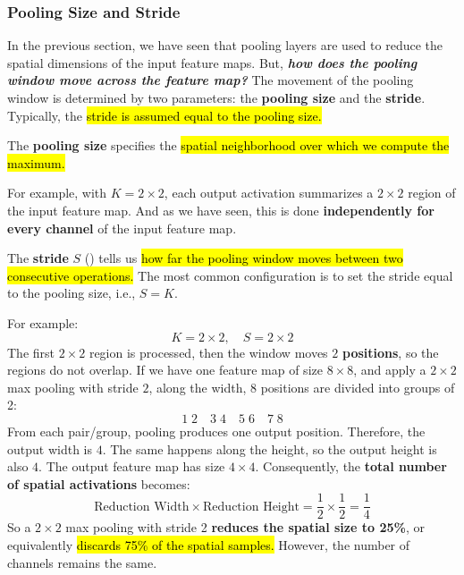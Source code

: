 \subsubsection{Pooling Size and Stride}\label{sec:pooling-size-and-stride}

In the previous section, we have seen that pooling layers are used to reduce the spatial dimensions of the input feature maps. But, \emph{\textbf{how does the pooling window move across the feature map?}} The movement of the pooling window is determined by two parameters: the \textbf{pooling size} and the \textbf{stride}. Typically, the \hl{stride is assumed equal to the pooling size.}

\highspace
\begin{flushleft}
    \textcolor{Green3}{ }
\end{flushleft}
The \textbf{pooling size} specifies the \hl{spatial neighborhood over which we compute the maximum.}

\highspace
For example, with $K = 2 \times 2$, each output activation summarizes a $2 \times 2$ region of the input feature map. And as we have seen, this is done \textbf{independently for every channel} of the input feature map.

\highspace
\begin{flushleft}
    \textcolor{Green3}{ }
\end{flushleft}
The \textbf{stride} $S$ () tells us \hl{how far the pooling window moves between two consecutive operations.} The most common configuration is to set the stride equal to the pooling size, i.e., $S = K$.

\highspace
For example:
\begin{equation*}
    K = 2 \times 2, \quad S = 2 \times 2
\end{equation*}
The first $2 \times 2$ region is processed, then the window moves $2$ \textbf{positions}, so the regions do not overlap. If we have one feature map of size $8 \times 8$, and apply a $2 \times 2$ max pooling with stride $2$, along the width, 8 positions are divided into groups of 2:
\begin{equation*}
    \boxed{1 \; 2} \quad \boxed{3 \; 4} \quad \boxed{5 \; 6} \quad \boxed{7 \; 8}
\end{equation*}
From each pair/group, pooling produces one output position. Therefore, the output width is $4$. The same happens along the height, so the output height is also $4$. The output feature map has size $4 \times 4$. Consequently, the \textbf{total number of spatial activations} becomes:
\begin{equation*}
    \text{Reduction Width} \times \text{Reduction Height} = \dfrac{1}{2} \times \dfrac{1}{2} = \dfrac{1}{4}
\end{equation*}
So a $2 \times 2$ max pooling with stride 2 \textbf{reduces the spatial size to 25\%}, or equivalently \hl{discards 75\% of the spatial samples.} However, the number of channels remains the same.

